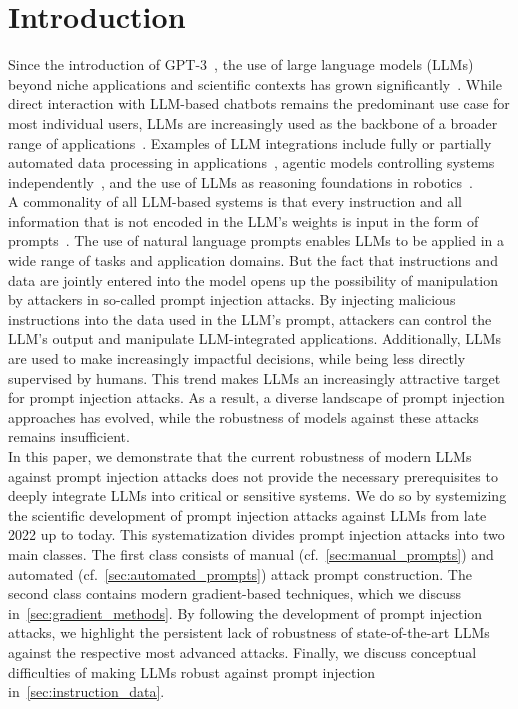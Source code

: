 \section{Introduction} \label{sec:introduction}
Since the introduction of GPT-3~\cite{NEURIPS2020_1457c0d6}, the use of large language models (LLMs) beyond niche applications and scientific contexts has grown significantly~\cite{hu_chatgpt_2023, annepaka_large_2025, bharathi_mohan_analysis_2024}.
While direct interaction with LLM-based chatbots remains the predominant use case for most individual users, LLMs are increasingly used as the backbone of a broader range of applications~\cite{raza_industrial_2025, chkirbene_large_2024}.
Examples of LLM integrations include fully or partially automated data processing in applications~\cite{tao_harnessing_2024, shehmir_llm4rec_2025}, agentic models controlling systems independently~\cite{guan_intelligent_2024, zhang_large_2025, luo_large_2025}, and the use of LLMs as reasoning foundations in robotics~\cite{kim_survey_2024, wang_large_2025, jeong_survey_2024}.\\

A commonality of all LLM-based systems is that every instruction and all information that is not encoded in the LLM's weights is input in the form of prompts~\cite{kamath_prompt-based_2024}.
The use of natural language prompts enables LLMs to be applied in a wide range of tasks and application domains.
But the fact that instructions and data are jointly entered into the model opens up the possibility of manipulation by attackers in so-called prompt injection attacks.
By injecting malicious instructions into the data used in the LLM's prompt, attackers can control the LLM's output and manipulate LLM-integrated applications.
Additionally, LLMs are used to make increasingly impactful decisions, while being less directly supervised by humans.
This trend makes LLMs an increasingly attractive target for prompt injection attacks.
As a result, a diverse landscape of prompt injection approaches has evolved, while the robustness of models against these attacks remains insufficient.\\

In this paper, we demonstrate that the current robustness of modern LLMs against prompt injection attacks does not provide the necessary prerequisites to deeply integrate LLMs into critical or sensitive systems.
We do so by systemizing the scientific development of prompt injection attacks against LLMs from late 2022 up to today.
This systematization divides prompt injection attacks into two main classes.
The first class consists of manual (cf.~\cref{sec:manual_prompts}) and automated (cf.~\cref{sec:automated_prompts}) attack prompt construction.
The second class contains modern gradient-based techniques, which we discuss in~\cref{sec:gradient_methods}.
By following the development of prompt injection attacks, we highlight the persistent lack of robustness of state-of-the-art LLMs against the respective most advanced attacks.
Finally, we discuss conceptual difficulties of making LLMs robust against prompt injection in~\cref{sec:instruction_data}.
